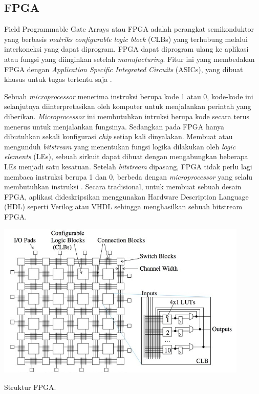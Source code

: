 \subsection{FPGA}
Field Programmable Gate Arrays atau FPGA adalah perangkat semikonduktor yang berbasis \textit{matriks configurable logic block} (CLBs) yang terhubung melalui interkoneksi yang dapat diprogram. FPGA dapat diprogram ulang ke aplikasi atau fungsi yang diinginkan setelah \textit{manufacturing}. Fitur ini yang membedakan FPGA dengan \textit{Application Specific Integrated Circuits} (ASICs), yang dibuat khusus untuk tugas tertentu saja .

Sebuah \textit{microprocessor} menerima instruksi berupa kode 1 atau 0, kode-kode ini selanjutnya diinterpretasikan oleh komputer untuk menjalankan perintah yang diberikan. \textit{Microprocessor} ini membutuhkan intruksi berupa kode secara terus menerus untuk menjalankan fungsinya. Sedangkan pada FPGA hanya dibutuhkan sekali konfigurasi \textit{chip} setiap kali dinyalakan. Membuat atau mengunduh \textit{bitstream} yang menentukan fungsi logika dilakukan oleh \textit{logic elements} (LEs), sebuah sirkuit dapat dibuat dengan mengabungkan beberapa LEs menjadi satu kesatuan. Setelah \textit{bitstream} dipasang, FPGA tidak perlu lagi membaca instruksi berupa 1 dan 0, berbeda dengan \textit{microprocessor} yang selalu membutuhkan instruksi . Secara tradisional, untuk membuat sebuah desain FPGA, aplikasi dideskripsikan menggunakan Hardware Description Language (HDL) seperti Verilog atau VHDL sehingga menghasilkan sebuah bitstream FPGA. 

\begin{afigure}
    \includegraphics[width=12cm, center]{images/fpga-structure.jpeg}
    \caption{Struktur FPGA.}
    \label{fig:fpga-structure}
\end{afigure}

